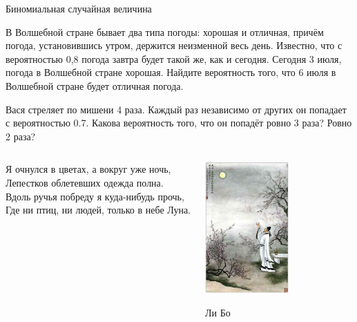 \documentclass[pdftex,unicode]{beamer}
\begin{document}
\begin{frame}{Биномиальная случайная величина}

\begin{block}{}
В Волшебной стране бывает два типа погоды: хорошая и отличная, причём погода, установившись утром, держится неизменной весь день. Известно, что с вероятностью 0,8 погода завтра будет такой же, как и сегодня. Сегодня 3 июля, погода в Волшебной стране хорошая. Найдите вероятность того, что 6 июля в Волшебной стране будет отличная погода.
\end{block}

\begin{block}{}
Вася стреляет по мишени 4 раза. Каждый раз независимо от других он попадает с вероятностью 0.7. Какова вероятность того, что он попадёт ровно 3 раза? Ровно 2 раза?
\end{block}


\end{frame}






\begin{frame}

\begin{columns}
\column{7.5cm}

\begin{flushleft}
Я очнулся в цветах, а вокруг уже ночь,  \\
Лепестков облетевших одежда полна.  \\
Вдоль ручья побреду я куда-нибудь прочь,  \\
Где ни птиц, ни людей, только в небе Луна.  
\end{flushleft}

\column{3cm}

\begin{flushright}
\includegraphics[height=50mm]{libo_moon.jpg}

Ли Бо 
\end{flushright}

\end{columns}


\end{frame}
\end{document}
